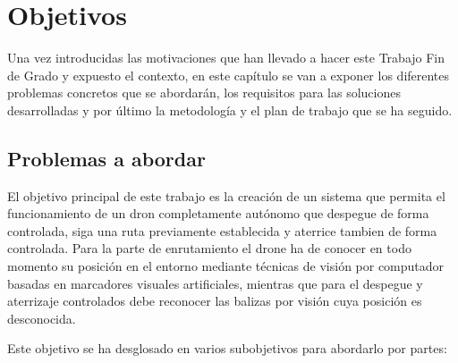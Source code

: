 \chapter{Objetivos}\label{cap.objetivos}
\hspace{1cm} Una vez introducidas las motivaciones que han llevado a hacer este Trabajo Fin de Grado y expuesto el contexto, en este capítulo se van a exponer los diferentes problemas concretos que se abordarán, los requisitos para las soluciones desarrolladas y por último la metodología y el plan de trabajo que se ha seguido. 


\section{Problemas a abordar}
\hspace{1cm} El objetivo principal de este trabajo es la creación de un sistema  que permita el funcionamiento de un dron completamente autónomo que despegue de forma controlada, siga una ruta previamente establecida y aterrice tambien de forma controlada. Para la parte de enrutamiento el drone ha de conocer en todo momento su posición en
el entorno mediante técnicas de visión por computador basadas en marcadores visuales artificiales, mientras que para el despegue y aterrizaje controlados debe reconocer las balizas por visión cuya posición es desconocida. 

\hspace{1cm} Este objetivo se ha desglosado en varios subobjetivos para abordarlo por partes:


